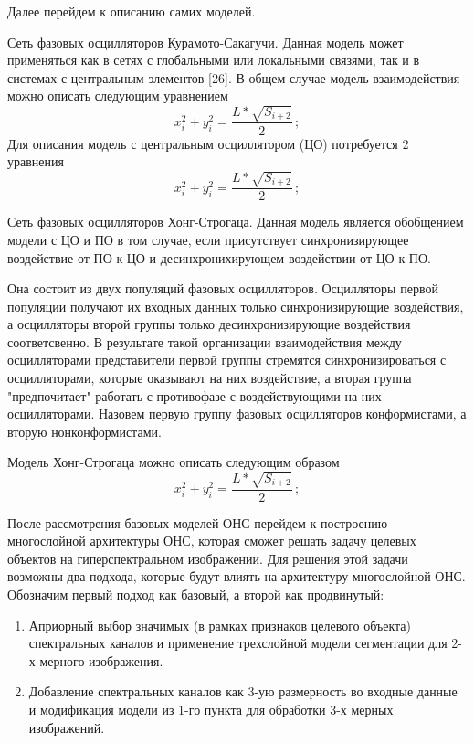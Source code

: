 \documentclass[14pt, russian]{scrartcl}
\begin{document}
Далее перейдем к описанию самих моделей.

Сеть фазовых осцилляторов Курамото-Сакагучи. Данная модель может применяться как в сетях с глобальными или локальными связями, так и в системах с центральным элементов [26]. В общем случае модель взаимодействия можно описать следующим уравнением
\begin{equation}\label{eq:4}
    x_i^2 + y^2_i = \frac{L*\sqrt{S_{i+2}}}{2}\,;
\end{equation}
Для описания модель с центральным осциллятором (ЦО) потребуется 2 уравнения
\begin{equation}\label{eq:5}
    x_i^2 + y^2_i = \frac{L*\sqrt{S_{i+2}}}{2}\,;
\end{equation}

Сеть фазовых осцилляторов Хонг-Строгаца. Данная модель является обобщением модели с ЦО и ПО в том случае, если присутствует синхронизирующее воздействие от ПО к ЦО и десинхронихирующем воздействии от ЦО к ПО.

Она состоит из двух популяций фазовых осцилляторов. Осцилляторы первой популяции получают их входных данных только синхронизирующие воздействия, а осцилляторы второй группы только десинхронизирующие воздействия соответсвенно. В результате такой организации взаимодействия между осцилляторами представители первой группы стремятся синхронизироваться с осцилляторами, которые оказывают на них воздействие, а вторая группа "предпочитает" работать с противофазе с воздействующими на них осцилляторами. Назовем первую группу фазовых осцилляторов конформистами, а вторую нонконформистами.

Модель Хонг-Строгаца можно описать следующим образом
\begin{equation}\label{eq:6}
    x_i^2 + y^2_i = \frac{L*\sqrt{S_{i+2}}}{2}\,;
\end{equation}

После рассмотрения базовых моделей ОНС перейдем к построению многослойной архитектуры ОНС, которая сможет решать задачу целевых объектов на гиперспектральном изображении. Для решения этой задачи возможны два подхода, которые будут влиять на архитектуру многослойной ОНС. Обозначим первый подход как базовый, а второй как продвинутый:

\begin{enumerate}
    \item Априорный выбор значимых (в рамках признаков целевого объекта) спектральных каналов и применение трехслойной модели сегментации для 2-х мерного изображения.
    \item Добавление спектральных каналов как 3-ую размерность во входные данные и модификация модели из 1-го пункта для обработки 3-х мерных изображений.
\end{enumerate}
\end{document}
